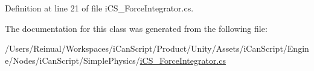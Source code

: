 Definition at line 21 of file i\+C\+S\+\_\+\+Force\+Integrator.\+cs.



The documentation for this class was generated from the following file\+:\begin{DoxyCompactItemize}
\item 
/\+Users/\+Reinual/\+Workspaces/i\+Can\+Script/\+Product/\+Unity/\+Assets/i\+Can\+Script/\+Engine/\+Nodes/i\+Can\+Script/\+Simple\+Physics/\hyperlink{i_c_s___force_integrator_8cs}{i\+C\+S\+\_\+\+Force\+Integrator.\+cs}\end{DoxyCompactItemize}
